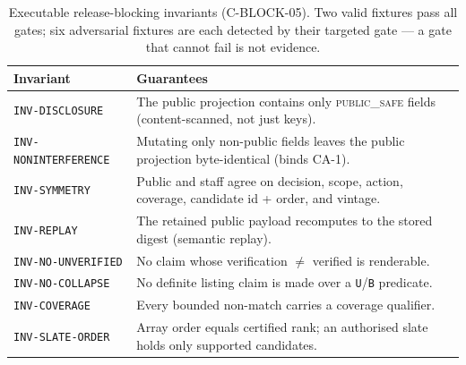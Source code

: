 \begin{table}[t]
\centering
\caption{Executable release-blocking invariants (C-BLOCK-05). Two valid fixtures pass all gates; six
adversarial fixtures are each detected by their targeted gate --- a gate that cannot fail is not
evidence.}
\label{tab:invariants}
\begin{tabular}{@{}lp{8.2cm}@{}}
\toprule
Invariant & Guarantees \\
\midrule
\texttt{INV-DISCLOSURE} & The public projection contains only \textsc{public\_safe} fields (content-scanned, not just keys). \\
\texttt{INV-NONINTERFERENCE} & Mutating only non-public fields leaves the public projection byte-identical (binds CA-1). \\
\texttt{INV-SYMMETRY} & Public and staff agree on decision, scope, action, coverage, candidate id + order, and vintage. \\
\texttt{INV-REPLAY} & The retained public payload recomputes to the stored digest (semantic replay). \\
\texttt{INV-NO-UNVERIFIED} & No claim whose verification $\neq$ verified is renderable. \\
\texttt{INV-NO-COLLAPSE} & No definite listing claim is made over a \texttt{U}/\texttt{B} predicate. \\
\texttt{INV-COVERAGE} & Every bounded non-match carries a coverage qualifier. \\
\texttt{INV-SLATE-ORDER} & Array order equals certified rank; an authorised slate holds only supported candidates. \\
\bottomrule
\end{tabular}
\end{table}



